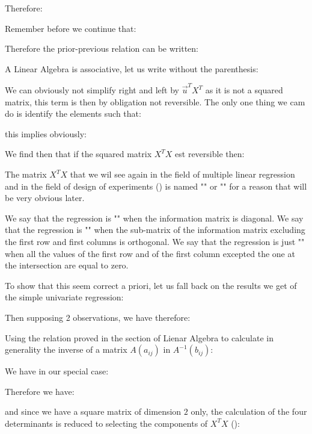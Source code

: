 	Therefore:
	
	Remember before we continue that:
	
	Therefore the prior-previous relation can be written:
	
	A Linear Algebra is associative, let us write without the parenthesis:
	
	We can obviously not simplify right and left by $\vec{u}^TX^T$ as it is not a squared matrix, this term is then by obligation not reversible. The only one thing we cam do is identify the elements such that:
	
	this implies obviously:
	
	We find then that if the squared matrix $X^TX$ est reversible then:
	
	The matrix $X^TX$ that we wil see again in the field of multiple linear regression and in the field of design of experiments () is named "" or "" for a reason that will be very obvious later.
	
	\begin{tcolorbox}[title=Remark,colframe=black,arc=10pt]
	We say that the regression is "" when the information matrix is diagonal. We say that the regression is "" when the sub-matrix of the information matrix excluding the first row and first columns is orthogonal. We say that the regression is just "" when all the values of the first row and of the first column excepted the one at the intersection are equal to zero.
	\end{tcolorbox}	
	To show that this seem correct a priori, let us fall back on the results we get of the simple univariate regression:
	
	Then supposing 2 observations, we have therefore:
	
	Using the relation proved in the section of Lienar Algebra to calculate in generality the inverse of a matrix $A(a_{ij})$ in $A^{-1}(b_{ij})$:
	
	We have in our special case:
		
	Therefore we have:
	
	and since we have a square matrix of dimension $2$ only, the calculation of the four determinants is reduced to selecting the components of $X^TX$ ():
	

